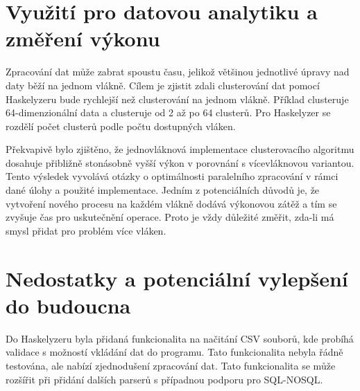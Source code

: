\documentclass[male,czech]{kithesis}
\begin{document}
\section{Využití pro datovou analytiku a změření výkonu}
 
Zpracování dat může zabrat spoustu času, 
jelikož většinou jednotlivé úpravy nad daty běží na jednom vlákně.
Cílem je zjistit zdali clusterování dat pomocí 
Haskelyzeru bude rychlejší než clusterování na jednom vlákně.
Příklad clusteruje 64-dimenzionální data a clusteruje 
od 2 až po 64 clusterů. 
Pro Haskelyzer se rozdělí počet clusterů podle počtu dostupných vláken.

Překvapivě bylo zjištěno, 
že jednovláknová implementace clusterovacího algoritmu 
dosahuje přibližně stonásobně vyšší výkon v porovnání s vícevláknovou variantou. 
Tento výsledek vyvolává otázky o optimálnosti paralelního zpracování v rámci dané úlohy 
a použité implementace.
Jedním z potenciálních důvodů je, 
že vytvoření nového procesu na každém vlákně dodává výkonovou zátěž
a tím se zvyšuje čas pro uskutečnění operace.
Proto je vždy důležité změřit, 
zda-li má smysl přidat pro problém více vláken.

{\begin{center}
\end{center}
}

\section{Nedostatky a potenciální vylepšení do budoucna}

Do Haskelyzeru byla přidaná funkcionalita na načitání CSV souborů,
kde probíhá validace s možností vkládání dat do programu.
Tato funkcionalita nebyla řádně testována, 
ale nabízí zjednodušení zpracování dat.
Tato funkcionalita se může rozšířit při přidání dalších parserů 
s případnou podporu pro SQL-NOSQL.
\end{document}
